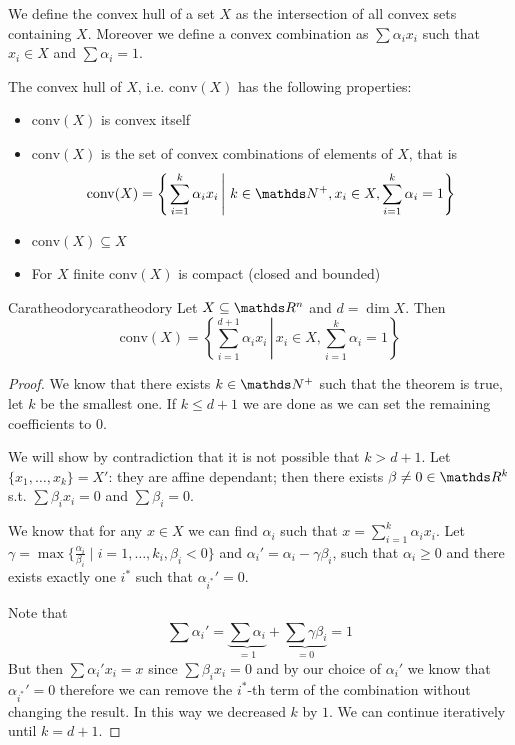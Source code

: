 \documentclass[12pt]{extarticle}
\begin{document}
We define the convex hull of a set $X$ as the intersection of all convex sets containing $X$.
Moreover we define a convex combination as $\sum \alpha_i x_i$ such that $x_i \in X$ and
$\sum \alpha_i = 1$.

The convex hull of $X$, i.e. $\mathrm{conv}(X)$ has the following properties:
\begin{itemize}
	\item $\mathrm{conv}(X)$ is convex itself
	\item $\mathrm{conv}(X)$ is the set of convex combinations of elements of $X$, that is
	      \begin{equation}
		      \mathrm{conv}(X) =
		      \left\{ \left.\sum_{i = 1}^k \alpha_i x_i \,\right|\, k \in \N^+ , x_i \in X, \sum_{i = 1}^k \alpha_i = 1 \right\}
	      \end{equation}
	\item $\mathrm{conv}(X) \subseteq X$
	\item For $X$ finite $\mathrm{conv}(X)$ is compact (closed and bounded)
\end{itemize}

\begin{theorem}{Caratheodory}{caratheodory}
	Let $X \subseteq \R^n$ and $d = \dim X$.
	Then
	\begin{equation}
		\mathrm{conv}(X) =
		\left\{ \left.\sum_{i = 1}^{d+1} \alpha_i x_i \,\right|\, x_i \in X, \sum_{i = 1}^k \alpha_i = 1 \right\}
	\end{equation}
\end{theorem}

\begin{proof}
	We know that there exists $k \in \N^+$ such that the theorem is true, let $k$ be the smallest one.
	If $k \leq d + 1$ we are done as we can set the remaining coefficients to $0$.

	We will show by contradiction that it is not possible that $k > d + 1$.
	Let $\{x_1, \dots, x_k\} = X'$: they are affine dependant;
	then there exists $\beta \neq 0 \in \R^k$ s.t. $\sum \beta_i x_i = 0$ and $\sum \beta_i = 0$.

	We know that for any $x \in X$ we can find $\alpha_i$ such that $x = \sum^k_{i = 1} \alpha_i x_i$.
	Let $\gamma = \max\{\frac{\alpha_i}{\beta_i} \mid i = 1, \dots, k_i, \beta_i < 0\}$
	and $\alpha_i' = \alpha_i - \gamma \beta_i$, such that $\alpha_i \geq 0$ and there exists exactly
	one $i^*$ such that $\alpha_{i^*}' = 0$.

	Note that
	\begin{equation}
		\sum \alpha_i' = \underbrace{\sum \alpha_i}_{=1} + \underbrace{\sum \gamma \beta_i}_{= 0} = 1
	\end{equation}
	But then $\sum \alpha_i' x_i = x$ since $\sum \beta_i x_i = 0$ and by our choice of $\alpha_i'$
	we know that $\alpha_{i^*}' = 0$ therefore we can remove the $i^*$-th term of the combination
	without changing the result.
	In this way we decreased $k$ by $1$.
	We can continue iteratively until $k = d+1$.
\end{proof}
\end{document}
